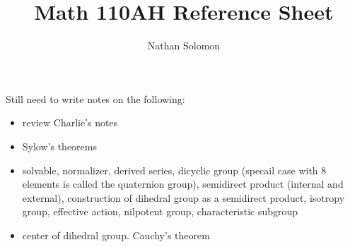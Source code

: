 \documentclass[12pt]{article}
\begin{document}
\title{Math 110AH Reference Sheet}
\author{Nathan Solomon}
\maketitle

Still need to write notes on the following:
\begin{itemize}
    \item review Charlie's notes
    \item Sylow's theorems
    \item solvable, normalizer, derived series, dicyclic group (specail case with 8 elements is called the quaternion group), semidirect product (internal and external), construction of dihedral group as a semidirect product, isotropy group, effective action, nilpotent group, characteristic subgroup
    \item center of dihedral group. Cauchy's theorem
\end{itemize}
\end{document}
